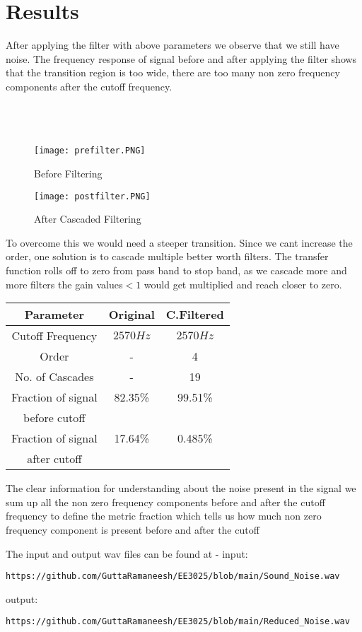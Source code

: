 \documentclass[journal,12pt,twocolumn]{IEEEtran}
\begin{document}
\section{\textbf{Results}}
    After applying the filter with above parameters we observe that we still have noise. The frequency response of signal before and after applying the filter shows that the transition region is too wide, there are too many non zero frequency components after the cutoff frequency.
\\
\\
\\
\\
\captionsetup[figure]{label format=empty}
\begin{figure}[H]
\centering
\texttt{[image: prefilter.PNG]}
\caption{Before Filtering}
\label{fig:Figure.1}
\texttt{[image: postfilter.PNG]}
\caption{After Cascaded Filtering}
\label{fig:Figure.2}
\end{figure}
    To overcome this we would need a steeper transition. Since we cant increase the order, one solution is to cascade multiple better worth filters. The transfer function rolls off to zero from pass band to stop band, as we cascade more and more filters the gain values$<1$ would get multiplied and reach closer to zero.
\begin{center}
\begin{tabular}{ |c|c|c| } 
 \hline
 Parameter & Original & C.Filtered\\
 \hline
 Cutoff Frequency & $2570Hz$ & $2570 Hz$\\ 
 \hline
 Order & - & 4\\ 
 \hline
No. of Cascades & - & 19\\ 
 \hline
Fraction of signal & 82.35\% & 99.51\%\\
before cutoff & & &\\
\hline
Fraction of signal  & 17.64\% & 0.485\%\\
after cutoff & & &\\
\hline
\end{tabular}
\end{center}
The clear information for understanding about the  noise present in the signal we sum up all the non zero frequency
components before and after the cutoff frequency to define the metric fraction which tells us how much non zero frequency component is present before and after the cutoff

The input and output wav files can be found at -
input:
\begin{lstlisting}
https://github.com/GuttaRamaneesh/EE3025/blob/main/Sound_Noise.wav
\end{lstlisting}
output:
\begin{lstlisting}
https://github.com/GuttaRamaneesh/EE3025/blob/main/Reduced_Noise.wav
\end{lstlisting}
\end{document}
